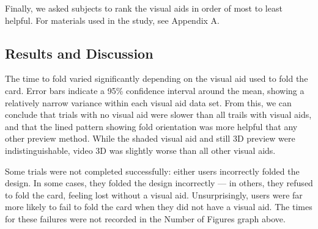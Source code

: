 Finally, we asked subjects to rank the visual aids in order of most to
least helpful. For materials used in the study, see Appendix A.

\subsection{Results and Discussion}\label{results-and-discussion}


The time to fold varied significantly depending on the visual aid used
to fold the card. Error bars indicate a 95\% confidence interval around
the mean, showing a relatively narrow variance within each visual aid
data set. From this, we can conclude that trials with no visual aid were
slower than all trails with visual aids, and that the lined pattern
showing fold orientation was more helpful that any other preview method.
While the shaded visual aid and still 3D preview were indistinguishable,
video 3D was slightly worse than all other visual aids.


Some trials were not completed successfully: either users incorrectly
folded the design. In some cases, they folded the design incorrectly ---
in others, they refused to fold the card, feeling lost without a visual
aid. Unsurprisingly, users were far more likely to fail to fold the card
when they did not have a visual aid. The times for these failures were
not recorded in the Number of Figures graph above.

